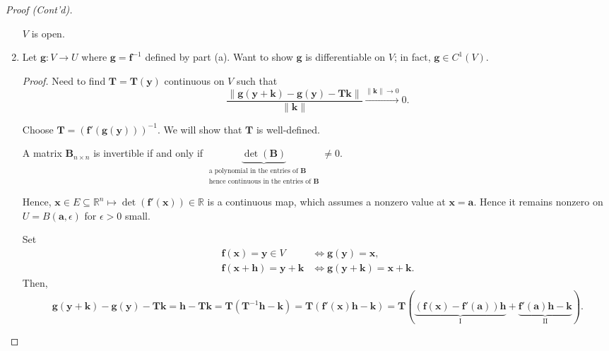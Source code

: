 \documentclass[letterpaper, reqno,11pt]{article}
\newcommand{\RR}{\mathbb{R}}
\begin{document}
\begin{proof}[Proof (Cont'd)]
\begin{enumerate}
     $V$ is open.

  \item Let $\mathbf g : V \to U$ where $\mathbf g = \mathbf f^{-1}$ defined by part (a). Want to show $\mathbf g$ is differentiable on $V$; in fact, $\mathbf g \in C^1(V)$.

    \noindent \emph{Proof.} Need to find $\mathbf T = \mathbf T(\mathbf y)$ continuous on $V$ such that
    \[ \frac{\lVert \mathbf g(\mathbf y + \mathbf k) - \mathbf g(\mathbf y) - \mathbf T \mathbf k \rVert}{\lVert \mathbf k \rVert} \xrightarrow{\lVert \mathbf k \rVert \to 0} 0. \]

    \fbox{\begin{minipage}{\textwidth}
        In $\RR$,
        \[ g \circ f(x) = x \Rightarrow g'(f(x)) \cdot f'(x) = 1 \Rightarrow g'\left(\underbrace{f(x)}_y\right) = \frac{1}{\underbrace{f'(x)}_{f'(f^{-1}(y))}}. \]
      \end{minipage}
    }

    Choose $\mathbf T = (\mathbf f'(\mathbf g(\mathbf y)))^{-1}$. We will show that $\mathbf T$ is well-defined.

     A matrix $\mathbf B_{n \times n}$ is invertible if and only if $\underbrace{\det(\mathbf B)}_{\substack{\text{a polynomial in the entries of $\mathbf B$} \\ \text{hence continuous in the entries of $\mathbf B$}}} \neq 0$.

    Hence, $\mathbf x \in E \subseteq \RR^n \mapsto \det(\mathbf f'(\mathbf x)) \in \RR$ is a continuous map, which assumes a nonzero value at $\mathbf x = \mathbf a$. Hence it remains nonzero on $U = B(\mathbf a, \epsilon)$ for $\epsilon > 0$ small.

    Set
    \begin{align*}
      \mathbf f(\mathbf x) = \mathbf y \in V & \Leftrightarrow \mathbf g(\mathbf y) = \mathbf x, \\
      \mathbf f(\mathbf x + \mathbf h) = \mathbf y + \mathbf k & \Leftrightarrow \mathbf g(\mathbf y + \mathbf k) = \mathbf x + \mathbf k.
    \end{align*}
    Then,
    \[ \mathbf g(\mathbf y + \mathbf k) - \mathbf g(\mathbf y) - \mathbf T \mathbf k = \mathbf h - \mathbf T \mathbf k = \mathbf T \left(\mathbf T^{-1} \mathbf h - \mathbf k\right) = \mathbf T(\mathbf f'(\mathbf x) \mathbf h - \mathbf k) = \mathbf T\left(\underbrace{(\mathbf f(\mathbf x) - \mathbf f'(\mathbf a)) \mathbf h}_\text{I} + \underbrace{\mathbf f'(\mathbf a) \mathbf h - \mathbf k}_\text{II}\right). \]
    

\end{enumerate}
\end{proof}
\end{document}
